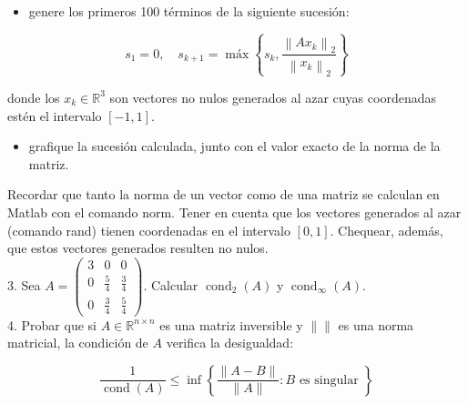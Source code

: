 \documentclass[10pt]{article}
\begin{document}
\begin{itemize}
  \item genere los primeros 100 términos de la siguiente sucesión:
\end{itemize}

$$
s_{1}=0, \quad s_{k+1}=\operatorname{máx}\left\{s_{k}, \frac{\left\|A x_{k}\right\|_{2}}{\left\|x_{k}\right\|_{2}}\right\}
$$

donde los $x_{k} \in \mathbb{R}^{3}$ son vectores no nulos generados al azar cuyas coordenadas estén el intervalo $[-1,1]$.

\begin{itemize}
  \item grafique la sucesión calculada, junto con el valor exacto de la norma de la matriz.
\end{itemize}

Recordar que tanto la norma de un vector como de una matriz se calculan en Matlab con el comando norm. Tener en cuenta que los vectores generados al azar (comando rand) tienen coordenadas en el intervalo $[0,1]$. Chequear, además, que estos vectores generados resulten no nulos.\\
3. Sea $A=\left(\begin{array}{ccc}3 & 0 & 0 \\ 0 & \frac{5}{4} & \frac{3}{4} \\ 0 & \frac{3}{4} & \frac{5}{4}\end{array}\right)$. Calcular $\operatorname{cond}_{2}(A)$ y $\operatorname{cond}_{\infty}(A)$.\\
4. Probar que si $A \in \mathbb{R}^{n \times n}$ es una matriz inversible y $\|\|$ es una norma matricial, la condición de $A$ verifica la desigualdad:

$$
\frac{1}{\operatorname{cond}(A)} \leq \inf \left\{\frac{\|A-B\|}{\|A\|}: B \text { es singular }\right\}
$$
\end{document}
